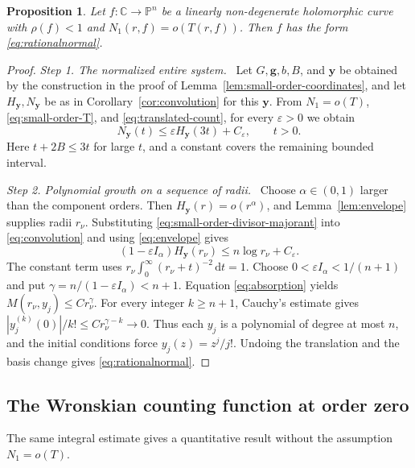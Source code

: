 \documentclass[11pt,letterpaper,reqno]{amsart}
\newtheorem{prop}[thm]{Proposition}
\theoremstyle{remark}
\numberwithin{equation}{section}
\newcommand{\C}{\mathbb C}
\newcommand{\PP}{\mathbb P}
\newcommand{\gv}{\bm g}
\newcommand{\yv}{\bm y}
\newcommand{\step}[1]{\medskip\noindent\emph{#1}\ }
\begin{document}
\begin{prop}\label{prop:small-order}
Let $f\colon\C\to\PP^n$ be a linearly non-degenerate holomorphic curve
with $\rho(f)<1$ and $N_1(r,f)=o(T(r,f))$. Then $f$ has the form
\eqref{eq:rationalnormal}.
\end{prop}
\begin{proof}
\step{Step 1. The normalized entire system.}
Let $G,\gv,b,B$, and $\yv$ be obtained by the construction in the proof of
Lemma~\ref{lem:small-order-coordinates}, and let $H_{\yv},N_{\yv}$ be
as in Corollary~\ref{cor:convolution} for this $\yv$.
From $N_1=o(T)$, \eqref{eq:small-order-T}, and
\eqref{eq:translated-count}, for every $\varepsilon>0$ we obtain
\begin{equation}\label{eq:small-order-divisor-majorant}
 N_{\yv}(t)\le\varepsilon H_{\yv}(3t)+C_\varepsilon,
 \qquad t>0.
\end{equation}
Here $t+2B\le3t$ for large $t$, and a constant covers the remaining bounded
interval.

\step{Step 2. Polynomial growth on a sequence of radii.}
Choose $\alpha\in(0,1)$ larger than the component orders. Then
$H_{\yv}(r)=o(r^\alpha)$, and Lemma~\ref{lem:envelope} supplies radii
$r_\nu$. Substituting \eqref{eq:small-order-divisor-majorant} into
\eqref{eq:convolution} and using \eqref{eq:envelope} gives
\begin{equation}\label{eq:absorption}
 (1-\varepsilon I_\alpha)H_{\yv}(r_\nu)
 \le n\log r_\nu+C_\varepsilon.
\end{equation}
The constant term uses $r_\nu\int_0^\infty(r_\nu+t)^{-2}\,\mathrm dt=1$.
Choose $0<\varepsilon I_\alpha<1/(n+1)$ and put
$\gamma=n/(1-\varepsilon I_\alpha)<n+1$.
Equation \eqref{eq:absorption} yields
$M(r_\nu,y_j)\le C r_\nu^\gamma$. For every integer $k\ge n+1$, Cauchy's
estimate gives
$|y_j^{(k)}(0)|/k!\le Cr_\nu^{\gamma-k}\to0$.
Thus each $y_j$ is a polynomial of degree at most $n$, and the initial
conditions force $y_j(z)=z^j/j!$. Undoing the translation and the basis
change gives \eqref{eq:rationalnormal}.
\end{proof}

\subsection{The Wronskian counting function at order zero}

The same integral estimate gives a quantitative result without the
assumption $N_1=o(T)$.
\end{document}
